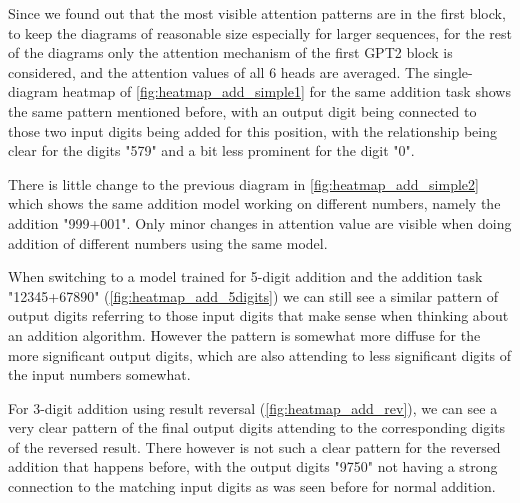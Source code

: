Since we found out that the most visible attention patterns are in the first block, to keep the diagrams of reasonable size especially for larger sequences, for the rest of the diagrams only the attention mechanism of the first GPT2 block is considered, and the attention values of all 6 heads are averaged.
The single-diagram heatmap of \cref{fig:heatmap_add_simple1} for the same addition task shows the same pattern mentioned before, with an output digit being connected to those two input digits being added for this position, with the relationship being clear for the digits "579" and a bit less prominent for the digit "0".

There is little change to the previous diagram in \cref{fig:heatmap_add_simple2} which shows the same addition model working on different numbers, namely the addition "999+001". Only minor changes in attention value are visible when doing addition of different numbers using the same model.










\FloatBarrier

When switching to a model trained for 5-digit addition and the addition task "12345+67890" (\cref{fig:heatmap_add_5digits}) we can still see a similar pattern of output digits referring to those input digits that make sense when thinking about an addition algorithm. However the pattern is somewhat more diffuse for the more significant output digits, which are also attending to less significant digits of the input numbers somewhat.

For 3-digit addition using result reversal (\cref{fig:heatmap_add_rev}), we can see a very clear pattern of the final output digits attending to the corresponding digits of the reversed result. There however is not such a clear pattern for the reversed addition that happens before, with the output digits "9750" not having a strong connection to the matching input digits as was seen before for normal addition.

